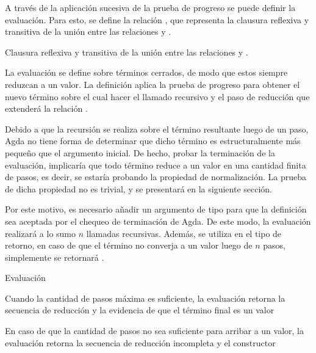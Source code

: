 A través de la aplicación sucesiva de la prueba de progreso se puede definir la evaluación.
Para esto, se define la relación \type{$\_\rightsquigarrow\_$}, que representa la clausura reflexiva y transitiva de la unión entre las relaciones \type{$\_\hookrightarrow\_$} y \type{$\_\rightleftarrows\_$}.

\begin{codigo}
	Clausura reflexiva y transitiva de la unión entre las relaciones \type{$\_\hookrightarrow\_$} y \type{$\_\rightleftarrows\_$}.
\end{codigo}

La evaluación se define sobre términos cerrados, de modo que estos siempre reduzcan a un valor.
La definición aplica la prueba de progreso para obtener el nuevo término sobre el cual hacer el llamado recursivo y el paso de reducción que extenderá la relación \type{$\_\rightsquigarrow\_$}.

Debido a que la recursión se realiza sobre el término resultante luego de un paso, Agda no tiene forma de determinar que dicho término es estructuralmente más pequeño que el argumento inicial.
De hecho, probar la terminación de la evaluación, implicaría que todo término reduce a un valor en una cantidad finita de pasos, es decir, se estaría probando la propiedad de normalización.
La prueba de dicha propiedad no es trivial, y se presentará en la siguiente sección.

Por este motivo, es necesario añadir un argumento de tipo  para que la definición sea aceptada por el chequeo de terminación de Agda.
De este modo, la evaluación realizará a lo sumo $n$ llamadas recursivas.
Además, se utiliza  en el tipo de retorno, en caso de que el término no converja a un valor luego de $n$ pasos, simplemente se retornará .


\begin{codigo}
	Evaluación
\end{codigo}

\begin{example}
	Cuando la cantidad de pasos máxima es suficiente, la evaluación retorna la secuencia de reducción y la evidencia de que el término final es un valor
\end{example}

\begin{example}
	En caso de que la cantidad de pasos no sea suficiente para arribar a un valor, la evaluación retorna la secuencia de reducción incompleta y el constructor 
\end{example}

